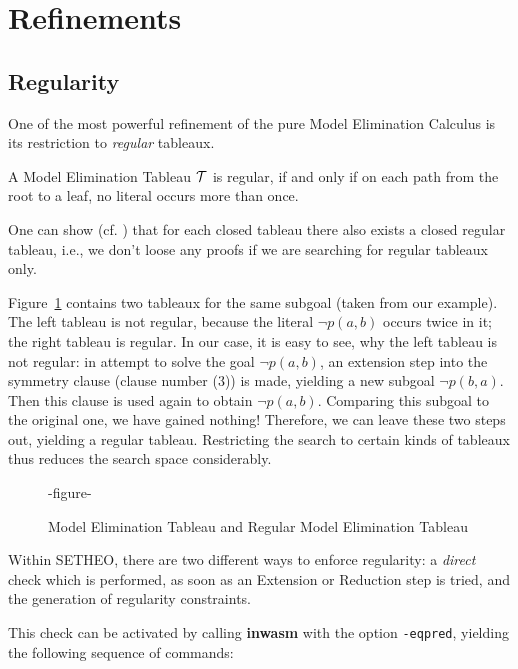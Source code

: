 \section{Refinements}
\subsection{Regularity}

One of the most powerful refinement of the pure Model Elimination
Calculus is its restriction to {\em regular\/} tableaux.

\begin{definition}
A Model Elimination Tableau $\cal T$ is regular, if and only if on
each path from the root to a leaf, no literal occurs more than once.
\end{definition}

One can show (cf. \cite{LSBB89,LMG94}) that for each closed tableau
there also exists a closed regular tableau, i.e., we don't loose any
proofs if we are searching for regular tableaux only.

Figure~\ref{fig:tut2:reg-tab} contains two tableaux for the same
subgoal (taken from our example). The left tableau is not regular,
because the literal $\neg p(a,b)$ occurs twice in it; the right tableau
is regular. In our case, it is easy to see, why the left tableau is
not regular: in attempt to solve the goal $\neg p(a,b)$, an extension
step into the symmetry clause (clause number (3)) is made, yielding
a new subgoal $\neg p(b,a)$. Then this clause is used again to
obtain $\neg p(a,b)$. Comparing this subgoal to the original one,
we have gained nothing! Therefore, we can leave these two steps out,
yielding a regular tableau. Restricting the search to certain kinds
of tableaux thus reduces the search space considerably.

\begin{figure}[htb]
-figure-
\caption{Model Elimination Tableau and Regular Model Elimination Tableau}
\label{fig:tut2:reg-tab}
\end{figure}

Within SETHEO, there are two different ways to enforce regularity:
a {\em direct\/} check which is performed, as soon as an Extension
or Reduction step is tried, and the generation of regularity constraints.

 This check can be
activated by calling {\bf inwasm} with the option {\tt -eqpred},
yielding the following sequence of commands:

